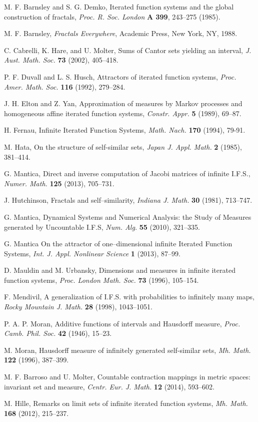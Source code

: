 \documentclass[final,epsfig,amsfont]{article}
\begin{document}
\frenchspacing
\begin{thebibliography}{}

  M. F. Barnsley and S. G. Demko,
{Iterated function systems and the global construction of
fractals}, {\it Proc. R. Soc. London} {\bf A 399},
243--275 (1985).

  M. F. Barnsley, {\it Fractals Everywhere}, Academic Press,
New York, NY, 1988.

 C. Cabrelli, K. Hare, and U. Molter,
 {Sums of Cantor sets yielding an interval,} {\it J. Aust. Math. Soc.} {\bf 73} (2002), 405--418.

P. F. Duvall and L. S. Husch, Attractors of iterated function systems, {\it Proc. Amer. Math. Soc.} {\bf 116} (1992), 279--284.

J. H. Elton and Z. Yan,
{Approximation of measures by Markov processes and
homogeneous affine iterated function systems},
{\it Constr. Appr.} {\bf 5} (1989), 69--87.

H. Fernau,
Infinite Iterated Function Systems,
{\it Math. Nach.} {\bf 170} (1994), 79-91.

M. Hata, On the structure of self-similar sets, {\it Japan J. Appl. Math.} {\bf 2} (1985), 381--414.

G. Mantica, Direct and inverse computation of Jacobi matrices of infinite I.F.S., {\em Numer. Math.} {\bf 125} (2013), 705--731.

  J. Hutchinson, {Fractals and self--similarity},
{\it Indiana J. Math.} {\bf 30} (1981), 713--747.

  G. Mantica,  {Dynamical Systems and Numerical Analysis: the Study of Measures generated by Uncountable I.F.S},  {\it Num. Alg.}  {\bf 55} (2010), 321--335.

  G. Mantica  {On the attractor of one--dimensional infinite Iterated Function Systems},  {\it Int. J. Appl. Nonlinear Science} {\bf 1} (2013), 87--99.

 D. Mauldin and M. Urbansky,
{Dimensions and measures in infinite iterated function
systems},  {\it Proc. London Math. Soc.} {\bf 73} (1996), 105--154.

F. Mendivil,
 {A generalization of I.F.S. with probabilities
to infinitely many maps},   {\it Rocky Mountain J. Math.}
{\bf 28} (1998), 1043--1051.

P. A. P. Moran, Additive functions of intervals and Hausdorff measure, {\it Proc. Camb. Phil. Soc.} {\bf 42} (1946), 15--23.

M. Moran,
Hausdorff measure of infinitely generated self-similar sets, {\it Mh. Math.} {\bf 122} (1996), 387--399.

M. F. Barroso and U. Molter,
Countable contraction mappings in metric spaces: invariant set and measure, {\it Centr. Eur. J. Math.} {\bf 12} (2014), 593--602.

M. Hille,
Remarks on limit sets of infinite iterated function systems, {\it Mh. Math.} {\bf 168} (2012), 215--237.
\end{thebibliography}
\end{document}
